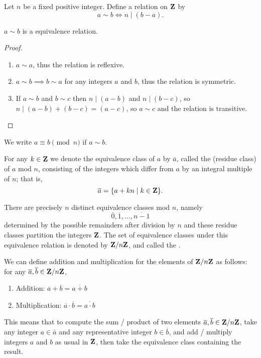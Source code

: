 \begin{example}
Let $n$ be a fixed positive integer. Define a relation on $\mathbf Z$ by
\[a\sim b\iff n\mid(b-a).\]
\begin{proposition}
$a\sim b$ is a equivalence relation.
\end{proposition}
\begin{proof} \
\begin{enumerate}[label=(\roman*)]
\item $a\sim a$, thus the relation is reflexive.
\item $a\sim b\implies b\sim a$ for any integers $a$ and $b$, thus the relation is symmetric.
\item If $a\sim b$ and $b\sim c$ then $n\mid(a-b)$ and $n\mid(b-c)$, so $n\mid(a-b)+(b-c)=(a-c)$, so $a\sim c$ and the relation is transitive.
\end{enumerate}
\end{proof}

\begin{notation}
We write $a\equiv b\pmod n$ if $a\sim b$.
\end{notation}

\begin{notation}
For any $k\in\mathbf Z$ we denote the equivalence class of $a$ by $\overline{a}$, called the  (residue class) of $a$ mod $n$, consisting of the integers which differ from $a$ by an integral multiple of $n$; that is,
\[\overline{a}=\{a+kn\mid k\in\mathbf Z\}.\]
\end{notation}

There are precisely $n$ distinct equivalence classes mod $n$, namely
\[\overline{0},\overline{1},\dots,\overline{n-1}\]
determined by the possible remainders after division by $n$ and these residue classes partition the integers $\mathbf Z$. The set of equivalence classes under this equivalence relation is denoted by $\mathbf Z/n\mathbf Z$, and called the .

We can define addition and multiplication for the elements of $\mathbf Z/n\mathbf Z$ as follows: for any $\overline{a},\overline{b}\in\mathbf Z/n\mathbf Z$,
\begin{enumerate}
\item Addition: $\overline{a}+\overline{b}=\overline{a+b}$
\item Multiplication: $\overline{a}\cdot\overline{b}=\overline{a\cdot b}$
\end{enumerate}

This means that to compute the sum / product of two elements $\overline{a},\overline{b}\in\mathbf Z/n\mathbf Z$, take any  integer $a\in\overline{a}$ and any representative integer $b\in\overline{b}$, and add / multiply integers $a$ and $b$ as usual in $\mathbf Z$, then take the equivalence class containing the result.


\end{example}
